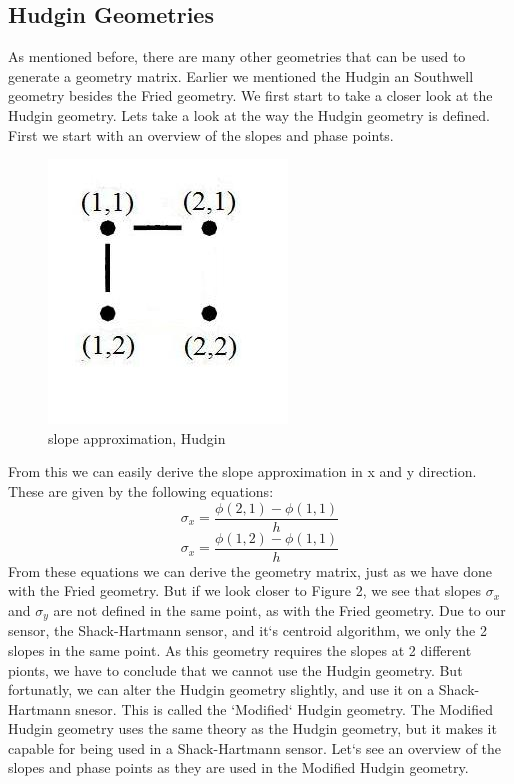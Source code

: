 \documentclass{article}
\begin{document}
\subsection{Hudgin Geometries}
As mentioned before, there are many other geometries that can be used to generate a geometry matrix. Earlier we mentioned the Hudgin an Southwell geometry besides the Fried geometry. We first start to take a closer look at the Hudgin geometry.
\newline
\newline
Lets take a look at the way the Hudgin geometry is defined. First we start with an overview of the slopes and phase points.
\begin{figure}[h!]
  \centering
  \includegraphics[scale=0.6]{figures/Hudgin}
  \caption{slope approximation, Hudgin}
\end{figure}
From this we can easily derive the slope approximation in x and y direction. These are given by the following equations:
$$ \sigma_x = \frac{\phi(2,1)-\phi(1,1)}{h}$$
$$ \sigma_x = \frac{\phi(1,2)-\phi(1,1)}{h}$$
From these equations we can derive the geometry matrix, just as we have done with the Fried geometry. But if we look closer to Figure 2, we see that slopes $\sigma_x$ and $\sigma_y$ are not defined in the same point, as with the Fried geometry. Due to our sensor, the Shack-Hartmann sensor, and it`s centroid algorithm, we only the 2 slopes in the same point. As this geometry requires the slopes at 2 different pionts, we have to conclude that we cannot use the Hudgin geometry. But fortunatly, we can alter the Hudgin geometry slightly, and use it on a Shack-Hartmann snesor. This is called the `Modified` Hudgin geometry\cite{rosensteiner2011cumulative}.
\newline
\newline
The Modified Hudgin geometry uses the same theory as the Hudgin geometry, but it makes it capable for being used in a Shack-Hartmann sensor. Let`s see an overview of the slopes and phase points as they are used in the Modified Hudgin geometry.  
\end{document}
